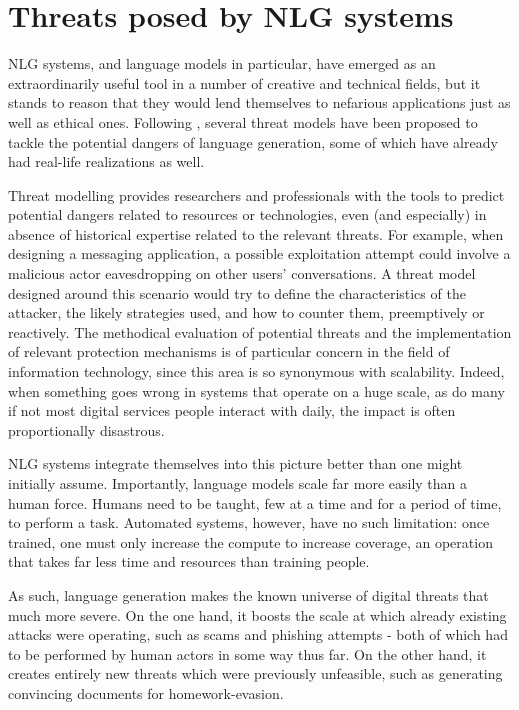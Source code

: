 \section{Threats posed by NLG systems}
\label{sec:threats}

NLG systems, and language models in particular, have emerged as an extraordinarily useful tool in a number of creative and technical fields, but it stands to reason that they would lend themselves to nefarious applications just as well as ethical ones.
Following \citet{crothers2023machinegeneratedtextcomprehensive}, several threat models \citep{shostack2014security} have been proposed to tackle the potential dangers of language generation, some of which have already had real-life realizations as well.

Threat modelling provides researchers and professionals with the tools to predict potential dangers related to resources or technologies, even (and especially) in absence of historical expertise related to the relevant threats.
For example, when designing a messaging application, a possible exploitation attempt could involve a malicious actor eavesdropping on other users' conversations.
A threat model designed around this scenario would try to define the characteristics of the attacker, the likely strategies used, and how to counter them, preemptively or reactively.
The methodical evaluation of potential threats and the implementation of relevant protection mechanisms is of particular concern in the field of information technology, since this area is so synonymous with scalability.
Indeed, when something goes wrong in systems that operate on a huge scale, as do many if not most digital services people interact with daily, the impact is often proportionally disastrous.

NLG systems integrate themselves into this picture better than one might initially assume.
Importantly, language models scale far more easily than a human force. Humans need to be taught, few at a time and for a period of time, to perform a task.
Automated systems, however, have no such limitation: once trained, one must only increase the compute to increase coverage, an operation that takes far less time and resources than training people.

As such, language generation makes the known universe of digital threats that much more severe.
On the one hand, it boosts the scale at which already existing attacks were operating, such as scams and phishing attempts - both of which had to be performed by human actors in some way thus far.
On the other hand, it creates entirely new threats which were previously unfeasible, such as generating convincing documents for homework-evasion.

